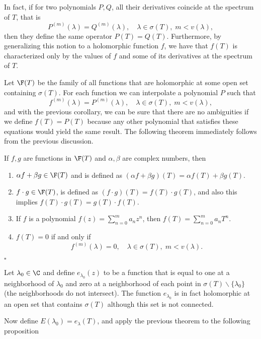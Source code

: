 In fact, if for two polynomials $P,Q$, all their derivatives coincide at the spectrum of $T$, that is
\[ P^{(m)} (\lambda) = Q^{(m)}(\lambda),\quad \lambda \in \sigma(T),\; m < v(\lambda), \]
then they define the same operator $P(T) = Q(T)$. Furthermore, by generalizing this notion to a holomorphic function $f$, we have that $f(T)$ is characterized only by the values of $f$ and some of its derivatives at the spectrum of $T$.

Let $\F(T)$ be the family of all functions that are holomorphic at some open set containing $\sigma(T)$. For each function we can interpolate a polynomial $P$ such that
\[ f^{(m)} (\lambda) = P^{(m)}(\lambda),\quad \lambda \in \sigma(T),\; m < v(\lambda), \]
and with the previous corollary, we can be sure that there are no ambiguities if we define $f(T) = P(T)$ because any other polynomial that satisfies these equations would yield the same result. The following theorem immediately follows from the previous discussion.

\begin{theorem} If $f,g$ are functions in $\F(T)$ and $\alpha,\beta$ are complex numbers, then
    \begin{enumerate}[label = (\alph*)]
        \item $\alpha f + \beta g \in \F(T)$ and is defined as $(\alpha f + \beta g) (T) = \alpha f(T) + \beta g(T)$.
        \item $f \cdot g \in \F(T)$, is defined as $(f \cdot g) (T) = f(T)\cdot g(T)$, and also this implies $f(T)\cdot g(T) = g(T)\cdot f(T)$.
        \item If $f$ is a polynomial $f(z) = \sum_{n = 0}^{m} a_n z^n$, then $f(T) = \sum_{n = 0}^{m} a_n T^n$.
        \item $f(T) = 0$ if and only if
        \[ f^{(m)} (\lambda) = 0,\quad \lambda \in \sigma(T),\; m < v(\lambda). \]
    \end{enumerate}
\end{theorem}
$ $\hfill $\square$

Let $\lambda_0 \in \C$ and define $e_{\lambda_0}(z)$ to be a function that is equal to one at a neighborhood of $\lambda_0$ and zero at a neighborhood of each point in $\sigma(T) \backslash \{\lambda_0\}$ (the neighborhoods do not intersect). The function $e_{\lambda_0}$ is in fact holomorphic at an open set that contains $\sigma(T)$ although this set is not connected. 

Now define $E(\lambda_0) = e_{\lambda}(T)$, and apply the previous theorem to the following proposition

